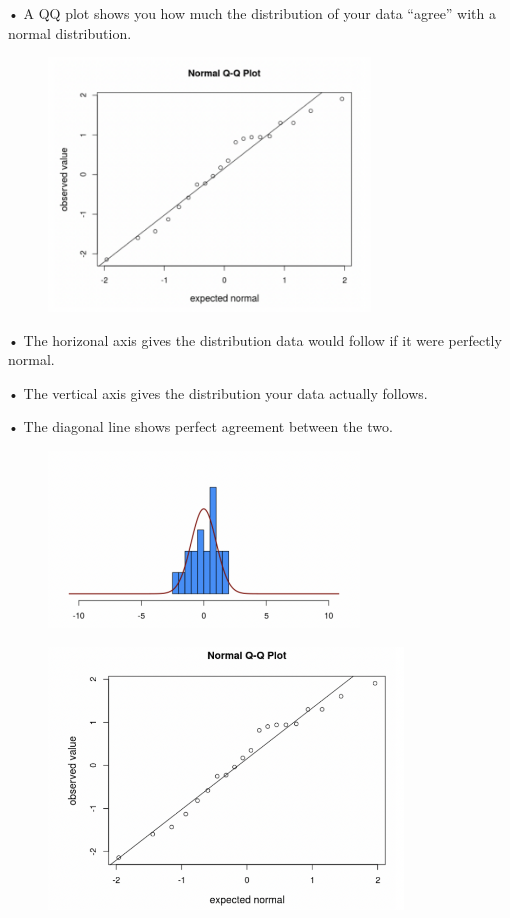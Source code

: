 \documentclass[
  letterpaper,
  DIV=11,
  numbers=noendperiod]{scrreprt}
\begin{document}
• A QQ plot shows you how much the distribution of your data ``agree''
with a normal distribution.

\begin{figure}

{\centering \includegraphics[width=3.36458in,height=\textheight]{images/mod4_pt1_9.png}

}

\end{figure}

• The horizonal axis gives the distribution data would follow if it were
perfectly normal.

• The vertical axis gives the distribution your data actually follows.

• The diagonal line shows perfect agreement between the two.

\begin{figure}

\includegraphics[width=3.25in,height=\textheight]{images/mod4_pt1_10.png} \hfill{}

\end{figure}

\begin{figure}

\hfill{} \includegraphics[width=3.70833in,height=\textheight]{images/mod4_pt1_11.png}

\end{figure}
\end{document}
